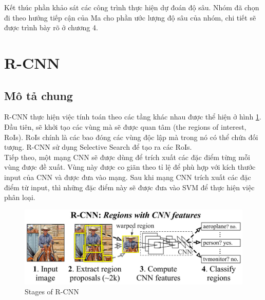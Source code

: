 Kết thúc phần khảo sát các công trình thực hiện dự đoán độ sâu. Nhóm đã chọn đi theo hướng tiếp cận của Ma \cite{Ma2017SparseToDense} cho phần ước lượng độ sâu của nhóm, chi tiết sẽ được trình bày rõ ở chương 4.



\section{R-CNN} 

\subsection{Mô tả chung}

R-CNN \cite{Girshick2013} thực hiện việc tính toán theo các tầng khác nhau được thể hiện ở hình \ref{fig:rcnn}. Đầu tiên, sẽ khởi tạo các vùng mà sẽ được quan tâm (the regions of interest, RoIs). RoIs chính là các bao đóng các vùng độc lập mà trong nó có thể chứa đối tượng. R-CNN sử dụng Selective Search để tạo ra các RoIs.\\

Tiếp theo, một mạng CNN sẽ được dùng để trích xuất các đặc điểm từng mỗi vùng được đề xuất. Vùng này được co giãn theo tỉ lệ để phù hợp với kích thước input của CNN và được đưa vào mạng. Sau khi mạng CNN trích xuất các đặc điểm từ input, thì những đặc điểm này sẽ được đưa vào SVM để thực hiện việc phân loại.

\begin{center}
   \begin{figure}[H]
   \begin{center}
     \includegraphics[scale=1.3]{image/rcnn}
    \end{center}
    \caption{Stages of R-CNN}
    \label{fig:rcnn}
    \end{figure}
\end{center}


